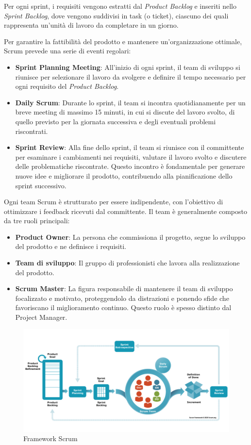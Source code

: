 Per ogni sprint, i requisiti vengono estratti dal \textit{Product Backlog} e inseriti nello \textit{Sprint Backlog}, dove vengono suddivisi in task (o ticket), ciascuno dei quali rappresenta un'unità di lavoro da completare in un giorno.

Per garantire la fattibilità del prodotto e mantenere un'organizzazione ottimale, Scrum prevede una serie di eventi regolari:

\begin{itemize}
    \item \textbf{Sprint Planning Meeting}: All'inizio di ogni sprint, il team di sviluppo si riunisce per selezionare il lavoro da svolgere e definire il tempo necessario per ogni requisito del \textit{Product Backlog}.
    \item \textbf{Daily Scrum}: Durante lo sprint, il team si incontra quotidianamente per un breve meeting di massimo 15 minuti, in cui si discute del lavoro svolto, di quello previsto per la giornata successiva e degli eventuali problemi riscontrati.
    \item \textbf{Sprint Review}: Alla fine dello sprint, il team si riunisce con il committente per esaminare i cambiamenti nei requisiti, valutare il lavoro svolto e discutere delle problematiche riscontrate. Questo incontro è fondamentale per generare nuove idee e migliorare il prodotto, contribuendo alla pianificazione dello sprint successivo.
\end{itemize}

Ogni team Scrum è strutturato per essere indipendente, con l'obiettivo di ottimizzare i feedback ricevuti dal committente. Il team è generalmente composto da tre ruoli principali:

\begin{itemize}
    \item \textbf{Product Owner}: La persona che commissiona il progetto, segue lo sviluppo del prodotto e ne definisce i requisiti.
    \item \textbf{Team di sviluppo}: Il gruppo di professionisti che lavora alla realizzazione del prodotto.
    \item \textbf{Scrum Master}: La figura responsabile di mantenere il team di sviluppo focalizzato e motivato, proteggendolo da distrazioni e ponendo sfide che favoriscano il miglioramento continuo. Questo ruolo è spesso distinto dal Project Manager.
\end{itemize}

\begin{figure}[h!]
    \centering
    \includegraphics[width=0.9\columnwidth]{img/scrum.png}
    \caption{Framework Scrum}
    \label{fig:scrum}
\end{figure}

